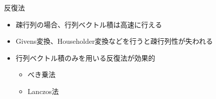 \begin{frame}[t,fragile]{反復法}
  \begin{itemize}
    \setlength{\itemsep}{1em}
  \item 疎行列の場合、行列ベクトル積は高速に行える
  \item Givens変換、Householder変換などを行うと疎行列性が失われる
  \item 行列ベクトル積のみを用いる反復法が効果的
    \begin{itemize}
    \item べき乗法
    \item Lanczos法
    \end{itemize}
  \end{itemize}
\end{frame}
